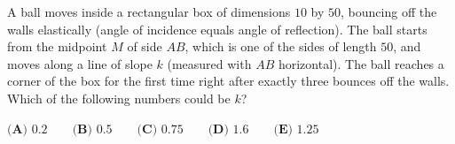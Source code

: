 A ball moves inside a rectangular box of dimensions \(10\) by \(50\), bouncing off the walls elastically (angle of incidence equals angle of reflection). The ball starts from the midpoint \(M\) of side \(AB\), which is one of the sides of length \(50\), and moves along a line of slope \(k\) (measured with \(AB\) horizontal). The ball reaches a corner of the box for the first time right after exactly three bounces off the walls. Which of the following numbers could be \(k\)?

\(\textbf{(A) }0.2\qquad\textbf{(B) }0.5\qquad\textbf{(C) }0.75\qquad\textbf{(D) }1.6\qquad\textbf{(E) }1.25\)
